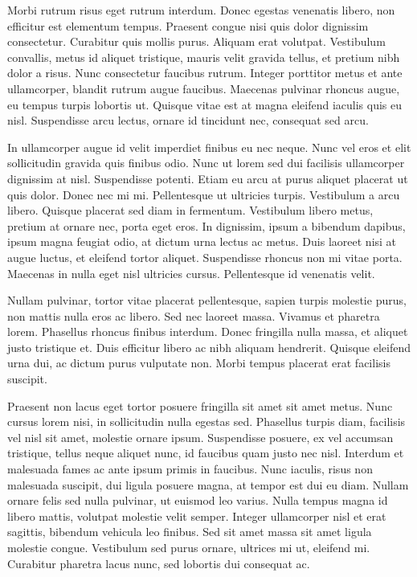 Morbi rutrum risus eget rutrum interdum. Donec egestas venenatis libero, non efficitur est elementum tempus. Praesent congue nisi quis dolor dignissim consectetur. Curabitur quis mollis purus. Aliquam erat volutpat. Vestibulum convallis, metus id aliquet tristique, mauris velit gravida tellus, et pretium nibh dolor a risus. Nunc consectetur faucibus rutrum. Integer porttitor metus et ante ullamcorper, blandit rutrum augue faucibus. Maecenas pulvinar rhoncus augue, eu tempus turpis lobortis ut. Quisque vitae est at magna eleifend iaculis quis eu nisl. Suspendisse arcu lectus, ornare id tincidunt nec, consequat sed arcu.

In ullamcorper augue id velit imperdiet finibus eu nec neque. Nunc vel eros et elit sollicitudin gravida quis finibus odio. Nunc ut lorem sed dui facilisis ullamcorper dignissim at nisl. Suspendisse potenti. Etiam eu arcu at purus aliquet placerat ut quis dolor. Donec nec mi mi. Pellentesque ut ultricies turpis. Vestibulum a arcu libero. Quisque placerat sed diam in fermentum. Vestibulum libero metus, pretium at ornare nec, porta eget eros. In dignissim, ipsum a bibendum dapibus, ipsum magna feugiat odio, at dictum urna lectus ac metus. Duis laoreet nisi at augue luctus, et eleifend tortor aliquet. Suspendisse rhoncus non mi vitae porta. Maecenas in nulla eget nisl ultricies cursus. Pellentesque id venenatis velit.

Nullam pulvinar, tortor vitae placerat pellentesque, sapien turpis molestie purus, non mattis nulla eros ac libero. Sed nec laoreet massa. Vivamus et pharetra lorem. Phasellus rhoncus finibus interdum. Donec fringilla nulla massa, et aliquet justo tristique et. Duis efficitur libero ac nibh aliquam hendrerit. Quisque eleifend urna dui, ac dictum purus vulputate non. Morbi tempus placerat erat facilisis suscipit.

Praesent non lacus eget tortor posuere fringilla sit amet sit amet metus. Nunc cursus lorem nisi, in sollicitudin nulla egestas sed. Phasellus turpis diam, facilisis vel nisl sit amet, molestie ornare ipsum. Suspendisse posuere, ex vel accumsan tristique, tellus neque aliquet nunc, id faucibus quam justo nec nisl. Interdum et malesuada fames ac ante ipsum primis in faucibus. Nunc iaculis, risus non malesuada suscipit, dui ligula posuere magna, at tempor est dui eu diam. Nullam ornare felis sed nulla pulvinar, ut euismod leo varius. Nulla tempus magna id libero mattis, volutpat molestie velit semper. Integer ullamcorper nisl et erat sagittis, bibendum vehicula leo finibus. Sed sit amet massa sit amet ligula molestie congue. Vestibulum sed purus ornare, ultrices mi ut, eleifend mi. Curabitur pharetra lacus nunc, sed lobortis dui consequat ac. 